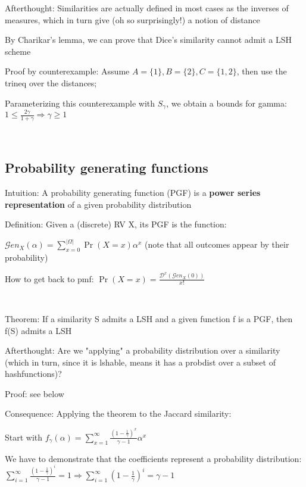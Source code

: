 \documentclass{report}
\begin{document}
	Afterthought: Similarities are actually defined in most cases as the inverses of measures, which in turn give (oh so surprisingly!) a notion of distance
	\
	
	By Charikar's lemma, we can prove that Dice's similarity cannot admit a LSH scheme
	
	Proof by counterexample: Assume $A=\{1\}, B=\{2\}, C=\{1, 2\}$, then use the trineq over the distances; %
	
	Parameterizing this counterexample with $S_\gamma$, we obtain a bounds for gamma: $1 \leq \frac{2\gamma}{1 + \gamma} \Rightarrow \gamma \geq 1$
	
	\
	
	\subsection{Probability generating functions}
	
	Intuition: A probability generating function (PGF) is a \textbf{power series representation} of a given probability distribution
	
	Definition: Given a (discrete) RV X, its PGF is the function:
	
	$\displaystyle \mathcal{G}en_X(\alpha)= \sum_{x=0}^{|\Omega|}\Pr(X=x)\alpha^x$ (note that all outcomes appear by their probability)
	
	How to get back to pmf: $\displaystyle \Pr(X=x) = \frac{\mathcal{D}^x(\mathcal{G}en_X(0))}{x!}$
	
	\
	
	Theorem: If a similarity S admits a LSH and a given function f is a PGF, then f(S) admits a LSH
	
	Afterthought: Are we "applying" a probability distribution over a similarity (which in turn, since it is lshable, means it has a probdist over a subset of hashfunctions)?
	
	Proof: see below
	
	Consequence: Applying the theorem to the Jaccard similarity:
	
	
	Start with $\displaystyle f_\gamma(\alpha) = \sum_{x=1}^{\infty}\frac{(1-\frac{1}{\gamma})^x}{\gamma -1}\alpha^x$
	
	We have to demonstrate that the coefficients represent a probability distribution: $\displaystyle \sum_{i=1}^{\infty}\frac{(1-\frac{1}{\gamma})^i}{\gamma -1}=1 \Rightarrow \sum_{i=1}^{\infty}(1-\frac{1}{\gamma})^i=\gamma -1$
	
\end{document}
